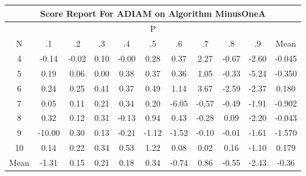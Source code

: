 \documentclass[11pt,a4paper]{report}
\begin{document}
\begin{longtable}{ | c || c | c | c | c | c | c | c | c | c || c |}
\hline
\multicolumn{11}{|c|}{ Score Report For ADIAM on Algorithm MinusOneA} \\
\hline
\multicolumn{11}{|c|}{ P } \\
\hline
N & .1 & .2 & .3 & .4 & .5 & .6 & .7 & .8 & .9 & Mean\\
 \hline
 \hline
 \endhead
  4 &  \cellcolor[HTML]{FFFFFF} -0.14 &  \cellcolor[HTML]{FFFFFF} -0.02 &  \cellcolor[HTML]{FFFFFF} 0.10 &  \cellcolor[HTML]{FFFFFF} -0.00 &  \cellcolor[HTML]{F7F7FF} 0.28 &  \cellcolor[HTML]{F7F7FF} 0.37 &  \cellcolor[HTML]{C7C7FF} 2.27 &  \cellcolor[HTML]{FFEFEF} -0.67 &  \cellcolor[HTML]{FFBFBF} -2.60 & -0.045 \\
  5 &  \cellcolor[HTML]{F7F7FF} 0.19 &  \cellcolor[HTML]{FFFFFF} 0.06 &  \cellcolor[HTML]{FFFFFF} 0.00 &  \cellcolor[HTML]{F7F7FF} 0.38 &  \cellcolor[HTML]{F7F7FF} 0.37 &  \cellcolor[HTML]{F7F7FF} 0.36 &  \cellcolor[HTML]{E7E7FF} 1.05 &  \cellcolor[HTML]{FFF7F7} -0.33 &  \cellcolor[HTML]{FF7878} -5.24 & -0.350 \\
  6 &  \cellcolor[HTML]{F7F7FF} 0.24 &  \cellcolor[HTML]{F7F7FF} 0.25 &  \cellcolor[HTML]{F7F7FF} 0.41 &  \cellcolor[HTML]{F7F7FF} 0.37 &  \cellcolor[HTML]{EFEFFF} 0.49 &  \cellcolor[HTML]{DFDFFF} 1.14 &  \cellcolor[HTML]{9F9FFF} 3.67 &  \cellcolor[HTML]{FFBFBF} -2.59 &  \cellcolor[HTML]{FFC7C7} -2.37 & 0.180 \\
  7 &  \cellcolor[HTML]{FFFFFF} 0.05 &  \cellcolor[HTML]{FFFFFF} 0.11 &  \cellcolor[HTML]{F7F7FF} 0.21 &  \cellcolor[HTML]{F7F7FF} 0.34 &  \cellcolor[HTML]{F7F7FF} 0.20 &  \cellcolor[HTML]{FF6868} -6.05 &  \cellcolor[HTML]{FFEFEF} -0.57 &  \cellcolor[HTML]{FFEFEF} -0.49 &  \cellcolor[HTML]{FFCFCF} -1.91 & -0.902 \\
  8 &  \cellcolor[HTML]{F7F7FF} 0.32 &  \cellcolor[HTML]{FFFFFF} 0.12 &  \cellcolor[HTML]{F7F7FF} 0.31 &  \cellcolor[HTML]{FFFFFF} -0.13 &  \cellcolor[HTML]{E7E7FF} 0.94 &  \cellcolor[HTML]{F7F7FF} 0.43 &  \cellcolor[HTML]{FFF7F7} -0.28 &  \cellcolor[HTML]{FFFFFF} 0.09 &  \cellcolor[HTML]{FFC7C7} -2.20 & -0.043 \\
  9 &  \cellcolor[HTML]{FF0000} -10.00 &  \cellcolor[HTML]{F7F7FF} 0.30 &  \cellcolor[HTML]{FFFFFF} 0.13 &  \cellcolor[HTML]{FFF7F7} -0.21 &  \cellcolor[HTML]{FFDFDF} -1.12 &  \cellcolor[HTML]{FFD7D7} -1.52 &  \cellcolor[HTML]{FFFFFF} -0.10 &  \cellcolor[HTML]{FFFFFF} -0.01 &  \cellcolor[HTML]{FFD7D7} -1.61 & -1.570 \\
  10 &  \cellcolor[HTML]{FFFFFF} 0.14 &  \cellcolor[HTML]{F7F7FF} 0.22 &  \cellcolor[HTML]{F7F7FF} 0.34 &  \cellcolor[HTML]{EFEFFF} 0.53 &  \cellcolor[HTML]{DFDFFF} 1.22 &  \cellcolor[HTML]{FFFFFF} 0.08 &  \cellcolor[HTML]{FFFFFF} 0.02 &  \cellcolor[HTML]{FFFFFF} 0.16 &  \cellcolor[HTML]{FFE7E7} -1.10 & 0.179 \\
 \hline
 \hline
Mean &  \cellcolor[HTML]{FFDFDF} -1.31 &  \cellcolor[HTML]{FFFFFF} 0.15 &  \cellcolor[HTML]{F7F7FF} 0.21 &  \cellcolor[HTML]{F7F7FF} 0.18 &  \cellcolor[HTML]{F7F7FF} 0.34 &  \cellcolor[HTML]{FFEFEF} -0.74 &  \cellcolor[HTML]{E7E7FF} 0.86 &  \cellcolor[HTML]{FFEFEF} -0.55 &  \cellcolor[HTML]{FFBFBF} -2.43 &  \cellcolor[HTML]{FFF7F7} -0.36
\end{longtable}
\end{document}
